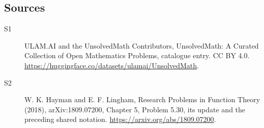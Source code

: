 \documentclass[11pt]{article}
\begin{document}
\subsection{Sources}
\begin{description}
\item[\hypertarget{source:statement:1}{S1}] ULAM.AI and the UnsolvedMath Contributors, UnsolvedMath: A Curated Collection of Open Mathematics Problems, catalogue entry. CC BY 4.0. \url{https://huggingface.co/datasets/ulamai/UnsolvedMath}.
\item[\hypertarget{source:statement:2}{S2}] W. K. Hayman and E. F. Lingham, Research Problems in Function Theory (2018), arXiv:1809.07200, Chapter 5, Problem 5.30, its update and the preceding shared notation. \url{https://arxiv.org/abs/1809.07200}.
\end{description}
\label{end:statement}
\end{document}
